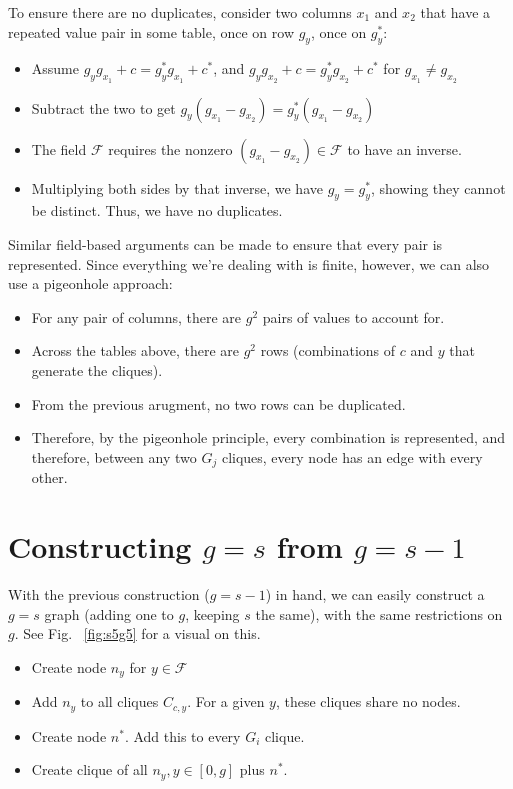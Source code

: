 \documentclass[11pt, oneside]{article} 	%
\begin{document}
To ensure there are no duplicates, consider two columns $x_1$ and $x_2$ that have a repeated value pair in some table, once on row $g_y$, once on $g_y^*$:

\begin{itemize}
\item Assume $g_yg_{x_1} + c = g_y^*g_{x_1} +c^*$, and $g_yg_{x_2} + c = g_y^*g_{x_2} +c^*$ for $g_{x_1} \neq g_{x_2}$
\item Subtract the two to get $g_y(g_{x_1} - g_{x_2}) = g_y^*(g_{x_1} - g_{x_2})$
\item The field $\mathcal{F}$ requires the nonzero $(g_{x_1} - g_{x_2}) \in \mathcal{F}$ to have an inverse. 
\item Multiplying both sides by that inverse, we have $g_y = g_y^*$, showing they cannot be distinct. Thus, we have no duplicates.
\end{itemize}

Similar field-based arguments can be made to ensure that every pair is represented. Since everything we're dealing with is finite, however, we can also use a pigeonhole approach:
\begin{itemize}
\item For any pair of columns, there are $g^2$ pairs of values to account for.
\item Across the tables above, there are $g^2$ rows (combinations of $c$ and $y$ that generate the cliques).
\item From the previous arugment, no two rows can be duplicated.
\item Therefore, by the pigeonhole principle, every combination is represented, and therefore, between any two $G_j$ cliques, every node has an edge with every other.
\end{itemize}


\section{Constructing $g=s$ from $g=s-1$}

With the previous construction ($g=s-1$) in hand, we can easily construct a $g=s$ graph (adding one to $g$, keeping $s$ the same), with the same restrictions on $g$. See Fig. ~\ref{fig:s5g5} for a visual on this.

\begin{itemize}
\item Create node $n_y$ for $y \in \mathcal{F}$
\item Add $n_y$ to all cliques $C_{c, y}$. For a given $y$, these cliques share no nodes.
\item Create node $n^*$. Add this to every $G_i$ clique.
\item Create clique of all $n_y, y \in [0, g]$ plus $n^*$.
\end{itemize}
\end{document}
